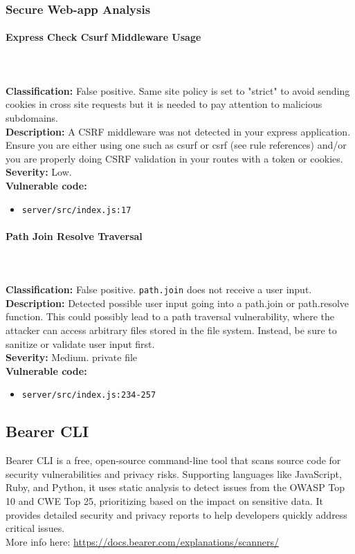 \documentclass[]{article}
\begin{document}
\subsubsection{Secure Web-app Analysis}

\paragraph{Express Check Csurf Middleware Usage} \mbox{} \\ \\
\textbf{Classification:} False positive. Same site policy is set to "strict" to avoid sending cookies in cross site requests but it is needed to pay attention to malicious subdomains.\\
\textbf{Description:} A CSRF middleware was not detected in your express application. Ensure you are either using one such as csurf or csrf (see rule references) and/or you are properly doing CSRF validation in your routes with a token or cookies. \\ 
\textbf{Severity:} Low. \\ 
\textbf{Vulnerable code:}
\begin{itemize}
    \item \texttt{server/src/index.js:17}
\end{itemize}

\paragraph{Path Join Resolve Traversal} \mbox{} \\ \\
\textbf{Classification:} False positive. \texttt{path.join} does not receive a user input. \\
\textbf{Description:} Detected possible user input going into a path.join or path.resolve function. This could possibly lead to a path traversal vulnerability, where the attacker can access arbitrary files stored in the file system. Instead, be sure to sanitize or validate user input first. \\ 
\textbf{Severity:} Medium. private file\\ 
\textbf{Vulnerable code:}
\begin{itemize}
    \item \texttt{server/src/index.js:234-257}
\end{itemize}

\subsection{Bearer CLI}
Bearer CLI is a free, open-source command-line tool that scans source code for security vulnerabilities and privacy risks. Supporting languages like JavaScript, Ruby, and Python, it uses static analysis to detect issues from the OWASP Top 10 and CWE Top 25, prioritizing based on the impact on sensitive data. It provides detailed security and privacy reports to help developers quickly address critical issues.\\
More info here: \footnotesize\url{https://docs.bearer.com/explanations/scanners/}
\normalsize
\end{document}
